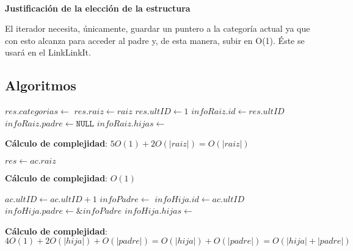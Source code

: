 \documentclass[10pt, a4paper]{article}
\let\TipoVariable=\texttt
\let\ModificadorArgumento=\textbf
\newcommand{\In}[2]{\ModificadorArgumento{in} \ensuremath{#1}\,: \TipoVariable{#2}\xspace}
\newcommand{\Inout}[2]{\ModificadorArgumento{in/out} \ensuremath{#1}\,: \TipoVariable{#2}\xspace}
\newcommand{\modTitulo}[1]{
  \vspace*{1ex}\par\noindent\textbf{\large #1}\par
}
\newcommand{\DRef}{\ensuremath{\rightarrow}}
\begin{document}
\mbox{}

~
~
\modTitulo{Justificaci\'on de la elecci\'on de la estructura}
\par El iterador necesita, \'unicamente, guardar un puntero a la categor\'ia actual ya que con esto alcanza para acceder al padre y, de esta manera, subir en O(1). \'Este se usar\'a en el LinkLinkIt.


\subsection{Algoritmos}

\begin{algorithm}[H]
\caption*{iNuevoAC(\In{raiz}{categoria}) $\DRef res$ : \TipoVariable{abCat}}
\begin{algorithmic}[1]
	\State $res.categorias \gets$ 
	\State $res.raiz \gets raiz$
	\State $res.ultID \gets 1$
	\Statex
	\State $infoRaiz.id \gets res.ultID$
	\State $infoRaiz.padre \gets \TipoVariable{NULL}$
	\State $infoRaiz.hijas \gets$ 
	\State {}
\end{algorithmic}
\textbf{C\'alculo de complejidad}: $5O(1) + 2O(|raiz|) = O(|raiz|)$
\end{algorithm}

\begin{algorithm}[H]
\caption*{iRaiz(\In{ac}{abCat}) $\DRef res$ : \TipoVariable{categoria}}
\begin{algorithmic}[1]
	\State $res \gets ac.raiz$
\end{algorithmic}
\textbf{C\'alculo de complejidad}: $O(1)$
\end{algorithm}

\begin{algorithm}[H]
\caption*{iAgregar(\Inout{ac}{abCat}, \In{padre}{categoria}, \In{hija}{categoria})}
\begin{algorithmic}[1]
	\State $ac.ultID \gets ac.ultID + 1$
	\State $infoPadre \gets$ 
	\Statex
	\State $infoHija.id \gets ac.ultID$
	\State $infoHija.padre \gets \&infoPadre$
	\State $infoHija.hijas \gets$ 
	\State {}
	\Statex
	\State {}
\end{algorithmic}
\textbf{C\'alculo de complejidad}: $4O(1) + 2O(|hija|) + O(|padre|) = O(|hija|) + O(|padre|) = O(|hija| + |padre|)$
\end{algorithm}
\end{document}
